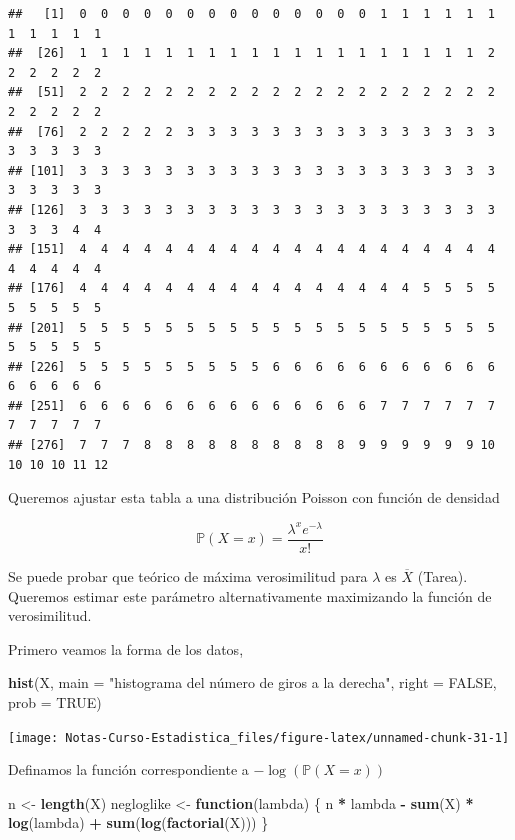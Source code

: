 \documentclass[
  12pt,
]{book}
\newenvironment{Shaded}{\begin{snugshade}}{\end{snugshade}}
\newcommand{\ControlFlowTok}[1]{\textcolor[rgb]{0.13,0.29,0.53}{\textbf{#1}}}
\newcommand{\DataTypeTok}[1]{\textcolor[rgb]{0.13,0.29,0.53}{#1}}
\newcommand{\KeywordTok}[1]{\textcolor[rgb]{0.13,0.29,0.53}{\textbf{#1}}}
\newcommand{\NormalTok}[1]{#1}
\newcommand{\OperatorTok}[1]{\textcolor[rgb]{0.81,0.36,0.00}{\textbf{#1}}}
\newcommand{\OtherTok}[1]{\textcolor[rgb]{0.56,0.35,0.01}{#1}}
\newcommand{\StringTok}[1]{\textcolor[rgb]{0.31,0.60,0.02}{#1}}
\begin{document}
\begin{verbatim}
##   [1]  0  0  0  0  0  0  0  0  0  0  0  0  0  0  1  1  1  1  1  1  1  1  1  1  1
##  [26]  1  1  1  1  1  1  1  1  1  1  1  1  1  1  1  1  1  1  1  2  2  2  2  2  2
##  [51]  2  2  2  2  2  2  2  2  2  2  2  2  2  2  2  2  2  2  2  2  2  2  2  2  2
##  [76]  2  2  2  2  2  3  3  3  3  3  3  3  3  3  3  3  3  3  3  3  3  3  3  3  3
## [101]  3  3  3  3  3  3  3  3  3  3  3  3  3  3  3  3  3  3  3  3  3  3  3  3  3
## [126]  3  3  3  3  3  3  3  3  3  3  3  3  3  3  3  3  3  3  3  3  3  3  3  4  4
## [151]  4  4  4  4  4  4  4  4  4  4  4  4  4  4  4  4  4  4  4  4  4  4  4  4  4
## [176]  4  4  4  4  4  4  4  4  4  4  4  4  4  4  4  4  5  5  5  5  5  5  5  5  5
## [201]  5  5  5  5  5  5  5  5  5  5  5  5  5  5  5  5  5  5  5  5  5  5  5  5  5
## [226]  5  5  5  5  5  5  5  5  5  6  6  6  6  6  6  6  6  6  6  6  6  6  6  6  6
## [251]  6  6  6  6  6  6  6  6  6  6  6  6  6  6  7  7  7  7  7  7  7  7  7  7  7
## [276]  7  7  7  8  8  8  8  8  8  8  8  8  8  9  9  9  9  9  9 10 10 10 10 11 12
\end{verbatim}

Queremos ajustar esta tabla a una distribución Poisson con función de densidad

\[
\mathbb{P}(X=x) = \frac{\lambda^x e^{-\lambda}}{x!} 
\]

Se puede probar que teórico de máxima verosimilitud para \(\lambda\) es \(\overline{X}\) (Tarea). Queremos estimar este parámetro alternativamente maximizando la función de verosimilitud.

Primero veamos la forma de los datos,

\begin{Shaded}
\begin{Highlighting}[]
\KeywordTok{hist}\NormalTok{(X, }\DataTypeTok{main =} \StringTok{"histograma del número de giros a la derecha"}\NormalTok{, }
    \DataTypeTok{right =} \OtherTok{FALSE}\NormalTok{, }\DataTypeTok{prob =} \OtherTok{TRUE}\NormalTok{)}
\end{Highlighting}
\end{Shaded}

\begin{center}\texttt{[image: Notas-Curso-Estadistica\_files/figure-latex/unnamed-chunk-31-1]} \end{center}

Definamos la función correspondiente a \(-\log(\mathbb{P}(X=x))\)

\begin{Shaded}
\begin{Highlighting}[]
\NormalTok{n \textless{}{-}}\StringTok{ }\KeywordTok{length}\NormalTok{(X)}
\NormalTok{negloglike \textless{}{-}}\StringTok{ }\ControlFlowTok{function}\NormalTok{(lambda) \{}
\NormalTok{    n }\OperatorTok{*}\StringTok{ }\NormalTok{lambda }\OperatorTok{{-}}\StringTok{ }\KeywordTok{sum}\NormalTok{(X) }\OperatorTok{*}\StringTok{ }\KeywordTok{log}\NormalTok{(lambda) }\OperatorTok{+}\StringTok{ }\KeywordTok{sum}\NormalTok{(}\KeywordTok{log}\NormalTok{(}\KeywordTok{factorial}\NormalTok{(X)))}
\NormalTok{\}}
\end{Highlighting}
\end{Shaded}
\end{document}
